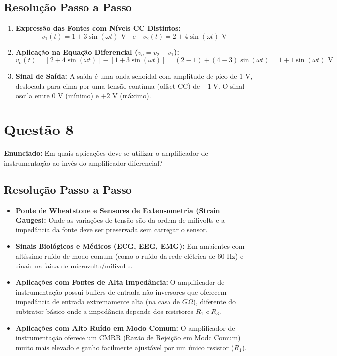 \subsection*{Resolução Passo a Passo}
\begin{enumerate}
    \item \textbf{Expressão das Fontes com Níveis CC Distintos:}
    \begin{equation*}
        v_1(t) = 1 + 3\sin(\omega t)\text{ V} \quad \text{e} \quad v_2(t) = 2 + 4\sin(\omega t)\text{ V}
    \end{equation*}

    \item \textbf{Aplicação na Equação Diferencial ($v_o = v_2 - v_1$):}
    \begin{equation*}
        v_o(t) = [2 + 4\sin(\omega t)] - [1 + 3\sin(\omega t)] = (2 - 1) + (4 - 3)\sin(\omega t) = 1 + 1\sin(\omega t)\text{ V}
    \end{equation*}

    \item \textbf{Sinal de Saída:}
    A saída é uma onda senoidal com amplitude de pico de $1\text{ V}$, deslocada para cima por uma tensão contínua (offset CC) de $+1\text{ V}$. O sinal oscila entre $0\text{ V}$ (mínimo) e $+2\text{ V}$ (máximo).
\end{enumerate}



\section*{Questão 8}
\textbf{Enunciado:} Em quais aplicações deve-se utilizar o amplificador de instrumentação ao invés do amplificador diferencial?

\subsection*{Resolução Passo a Passo}
\begin{itemize}
    \item \textbf{Ponte de Wheatstone e Sensores de Extensometria (Strain Gauges):} Onde as variações de tensão são da ordem de milivolts e a impedância da fonte deve ser preservada sem carregar o sensor.
    \item \textbf{Sinais Biológicos e Médicos (ECG, EEG, EMG):} Em ambientes com altíssimo ruído de modo comum (como o ruído da rede elétrica de 60 Hz) e sinais na faixa de microvolts/milivolts.
    \item \textbf{Aplicações com Fontes de Alta Impedância:} O amplificador de instrumentação possui buffers de entrada não-inversores que oferecem impedância de entrada extremamente alta (na casa de $G\Omega$), diferente do subtrator básico onde a impedância depende dos resistores $R_1$ e $R_3$.
    \item \textbf{Aplicações com Alto Ruído em Modo Comum:} O amplificador de instrumentação oferece um CMRR (Razão de Rejeição em Modo Comum) muito mais elevado e ganho facilmente ajustável por um único resistor ($R_1$).
\end{itemize}

